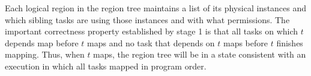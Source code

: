 Each logical region in the region tree maintains a
list of its physical instances and which sibling tasks are using those
instances and with what permissions.  The important correctness
property established by stage 1 is that all
tasks on which $t$ depends map before $t$ maps and no task that depends on
$t$ maps before $t$ finishes mapping.  Thus, when $t$ maps, the region tree
will be in a state consistent with an execution in which all tasks
mapped in program order.







